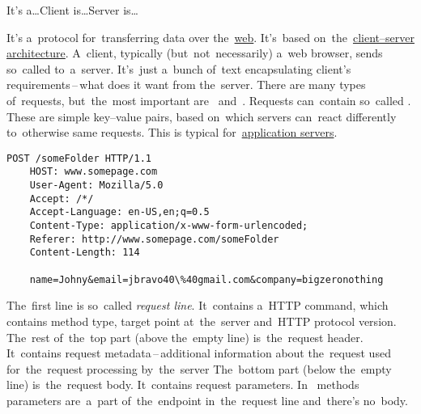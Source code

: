 \label{clientserverarchitecture}
\newline\todo It's a\dots Client is\dots Server is\dots

\label{tcpip}


\label{tcp}

\label{ip}

\label{http}
It's a~protocol for~transferring data over the~\hyperref[internetweb]{web}.
It's~based on~the~\hyperref[clientserverarchitecture]{client--server architecture}.
A~client, typically (but~not~necessarily) a~web browser, sends so~called  to~a~server.
It's~just a~bunch of~text encapsulating client's requirements\,--\,what does it want from the~server.
There are many types of~requests, but~the~most important are~ and~.
Requests can~contain so~called .
These are simple key--value pairs, based on~which servers can~react differently to~otherwise same requests.
This is typical for~\hyperref[applicationserver]{application servers}.

\begin{lstlisting}[title={Example of a~HTTP \textit{POST} request, parameters are~visible at~the~bottom}]
    POST /someFolder HTTP/1.1
    HOST: www.somepage.com
    User-Agent: Mozilla/5.0
    Accept: /*/
    Accept-Language: en-US,en;q=0.5
    Content-Type: application/x-www-form-urlencoded;
    Referer: http://www.somepage.com/someFolder
    Content-Length: 114

    name=Johny&email=jbravo40\%40gmail.com&company=bigzeronothing
\end{lstlisting}

\noindent The~first line is so~called \textit{request line}.
It~contains a~HTTP command, which contains method type, target point at~the~server and~HTTP protocol version.
The~rest of~the~top part (above the~empty line) is~the~request header.
It~contains request metadata\,--\,additional information about the~request used for~the~request processing by~the~server
The~bottom part (below the~empty line) is~the~request body.
It~contains request parameters.
In~ methods parameters are~a~part of~the~endpoint in~the~request line and~there's no~body.

